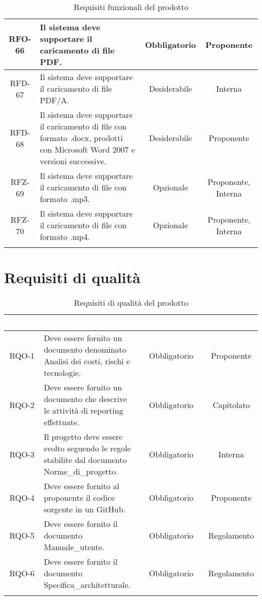 \begin{xltabular}{\textwidth}{| c | X | c | c |}
    \hline
    RFO-66 & Il sistema deve supportare il caricamento di file PDF. & Obbligatorio & Proponente \\
    \hline
    RFD-67 & Il sistema deve supportare il caricamento di file PDF/A. & Desiderabile & Interna \\
    \hline
    RFD-68 & Il sistema deve supportare il caricamento di  file con formato .docx, prodotti con Microsoft Word 2007 e versioni successive. & Desiderabile & Proponente \\
    \hline
    RFZ-69 & Il sistema deve supportare il caricamento di  file con formato .mp3. & Opzionale & Proponente, Interna \\
    \hline
    RFZ-70 & Il sistema deve supportare il caricamento di  file con formato .mp4. & Opzionale & Proponente, Interna \\
    \hline
    
    
  
     \caption{Requisiti funzionali del prodotto}
    \label{tab:reqfun}
\end{xltabular}
\endgroup
  
\section{Requisiti di qualità}

\begingroup
\setlength{\tabcolsep}{10pt}
\renewcommand{\arraystretch}{1.3}
\begin{xltabular}{\textwidth}{| c | X | c | c |}
    \hline
     \textbf{\textcolor{white}{Codice}} & \textbf{\textcolor{white}{Descrizione}} & \textbf{\textcolor{white}{Classificazione}} & \textbf{\textcolor{white}{Fonte}}\\
    \hline
    \endhead
    RQO-1 & Deve essere fornito un documento denominato Analisi dei costi, rischi e tecnologie. & Obbligatorio & Proponente \\
    \hline
    RQO-2 & Deve essere fornito un documento che descrive le attività di  reporting effettuate. & Obbligatorio & Capitolato \\
    \hline
    RQO-3 & Il progetto deve essere svolto seguendo le regole stabilite dal documento Norme\_di\_progetto. & Obbligatorio & Interna \\
    \hline
    RQO-4 & Deve essere fornito al proponente il codice sorgente in un  GitHub. & Obbligatorio & Proponente \\
    \hline
    RQO-5 & Deve essere fornito il documento Manuale\_utente. & Obbligatorio & Regolamento \\
    \hline
    RQO-6 & Deve essere fornito il documento Specifica\_architetturale. & Obbligatorio & Regolamento \\
    \hline
     \caption{Requisiti di qualità del prodotto}
    \label{tab:reqqua}
\end{xltabular}
\endgroup
\newpage
